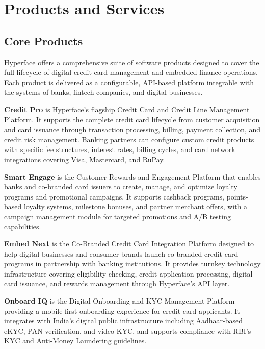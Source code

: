 \section{Products and Services}

\subsection{Core Products}

Hyperface offers a comprehensive suite of software products designed to cover the full lifecycle of digital credit card management and embedded finance operations. Each product is delivered as a configurable, API-based platform integrable with the systems of banks, fintech companies, and digital businesses.

\textbf{Credit Pro} is Hyperface's flagship Credit Card and Credit Line Management Platform. It supports the complete credit card lifecycle from customer acquisition and card issuance through transaction processing, billing, payment collection, and credit risk management. Banking partners can configure custom credit products with specific fee structures, interest rates, billing cycles, and card network integrations covering Visa, Mastercard, and RuPay.

\textbf{Smart Engage} is the Customer Rewards and Engagement Platform that enables banks and co-branded card issuers to create, manage, and optimize loyalty programs and promotional campaigns. It supports cashback programs, points-based loyalty systems, milestone bonuses, and partner merchant offers, with a campaign management module for targeted promotions and A/B testing capabilities.

\textbf{Embed Next} is the Co-Branded Credit Card Integration Platform designed to help digital businesses and consumer brands launch co-branded credit card programs in partnership with banking institutions. It provides turnkey technology infrastructure covering eligibility checking, credit application processing, digital card issuance, and rewards management through Hyperface's API layer.

\textbf{Onboard IQ} is the Digital Onboarding and KYC Management Platform providing a mobile-first onboarding experience for credit card applicants. It integrates with India's digital public infrastructure including Aadhaar-based eKYC, PAN verification, and video KYC, and supports compliance with RBI's KYC and Anti-Money Laundering guidelines.

